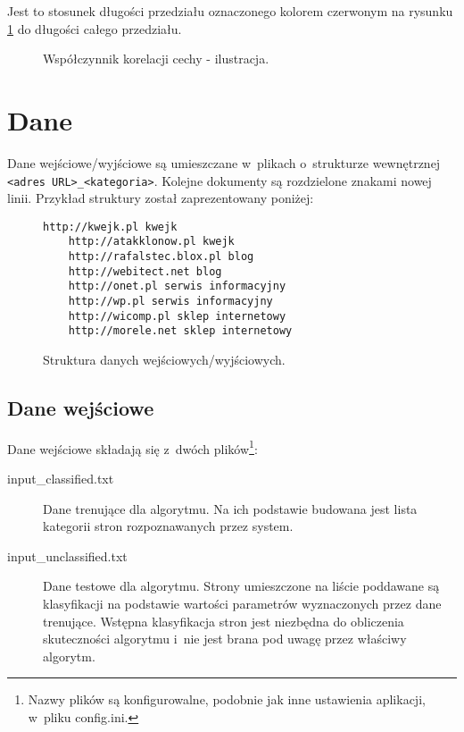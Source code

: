 \documentclass[a4paper,11pt]{article}
\begin{document}
Jest to stosunek długości przedziału oznaczonego kolorem czerwonym na rysunku \ref{fig:correlation_index} do długości całego przedziału.

\begin{figure}[ht!]
\centering
{}
    \caption{Współczynnik korelacji cechy - ilustracja.}
    \label{fig:correlation_index}
\end{figure}

\section{Dane}

Dane wejściowe/wyjściowe są umieszczane w~plikach o~strukturze wewnętrznej \verb+<adres URL>_<kategoria>+. Kolejne dokumenty są rozdzielone znakami nowej linii. Przykład struktury został zaprezentowany poniżej:

\begin{figure}[ht!]
    \begin{Verbatim}[frame=single]
    http://kwejk.pl kwejk
    http://atakklonow.pl kwejk
    http://rafalstec.blox.pl blog
    http://webitect.net blog
    http://onet.pl serwis informacyjny
    http://wp.pl serwis informacyjny
    http://wicomp.pl sklep internetowy
    http://morele.net sklep internetowy
    \end{Verbatim}
    \caption{Struktura danych wejściowych/wyjściowych.}
    \label{fig:input_output_structure}
\end{figure}

\subsection{Dane wejściowe}

Dane wejściowe składają się z~dwóch plików\footnote{Nazwy plików są konfigurowalne, podobnie jak inne ustawienia aplikacji, w~pliku config.ini.}:

\begin{description}
    \item[input\_classified.txt] Dane trenujące dla algorytmu. Na ich podstawie budowana jest lista kategorii stron rozpoznawanych przez system.
    \item[input\_unclassified.txt] Dane testowe dla algorytmu. Strony umieszczone na liście poddawane są klasyfikacji na podstawie wartości parametrów wyznaczonych przez dane trenujące. Wstępna klasyfikacja stron jest niezbędna do obliczenia skuteczności algorytmu i~nie jest brana pod uwagę przez właściwy algorytm.
\end{description}
\end{document}
